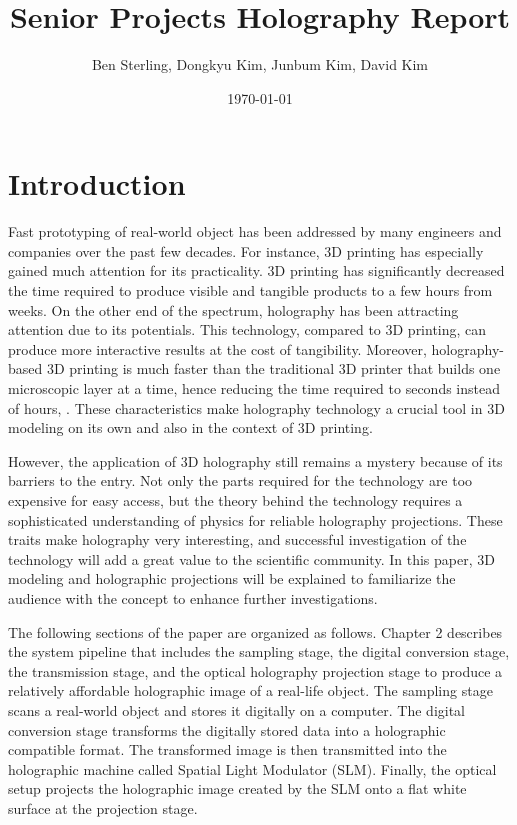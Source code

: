 \documentclass[12pt]{article}
\title{Senior Projects Holography Report}
\date{\today}
\author{Ben Sterling, Dongkyu Kim, Junbum Kim, David Kim}
\begin{document}
\maketitle
\clearpage

\section{Introduction}
\qquad
Fast prototyping of real-world object has been addressed by many engineers and companies over the past few decades. For instance, 3D printing has especially gained much attention for its practicality. 3D printing has significantly decreased the time required to produce visible and tangible products to a few hours from weeks. On the other end of the spectrum, holography has been attracting attention due to its potentials. This technology, compared to 3D printing, can produce more interactive results at the cost of tangibility. Moreover, holography-based 3D printing is much faster than the traditional 3D printer that builds one microscopic layer at a time, hence reducing the time required to seconds instead of hours,  \cite{Shusteffeaao5496}. These characteristics make holography technology a crucial tool in 3D modeling on its own and also in the context of 3D printing.

However, the application of 3D holography still remains a mystery because of its barriers to the entry. Not only the parts required for the technology are too expensive for easy access, but the theory behind the technology requires a sophisticated understanding of physics for reliable holography projections. These traits make holography very interesting, and successful investigation of the technology will add a great value to the scientific community. In this paper, 3D modeling and holographic projections will be explained to familiarize the audience with the concept to enhance further investigations.

\par
The following sections of the paper are organized as follows. Chapter 2 describes the system pipeline that includes the sampling stage, the digital conversion stage, the transmission stage, and the optical holography projection stage to produce a relatively affordable holographic image of a real-life object. The sampling stage scans a real-world object and stores it digitally on a computer. The digital conversion stage transforms the digitally stored data into a holographic compatible format. The transformed image is then transmitted into the holographic machine called Spatial Light Modulator (SLM). Finally, the optical setup projects the holographic image created by the SLM onto a flat white surface at the projection stage.
\end{document}
